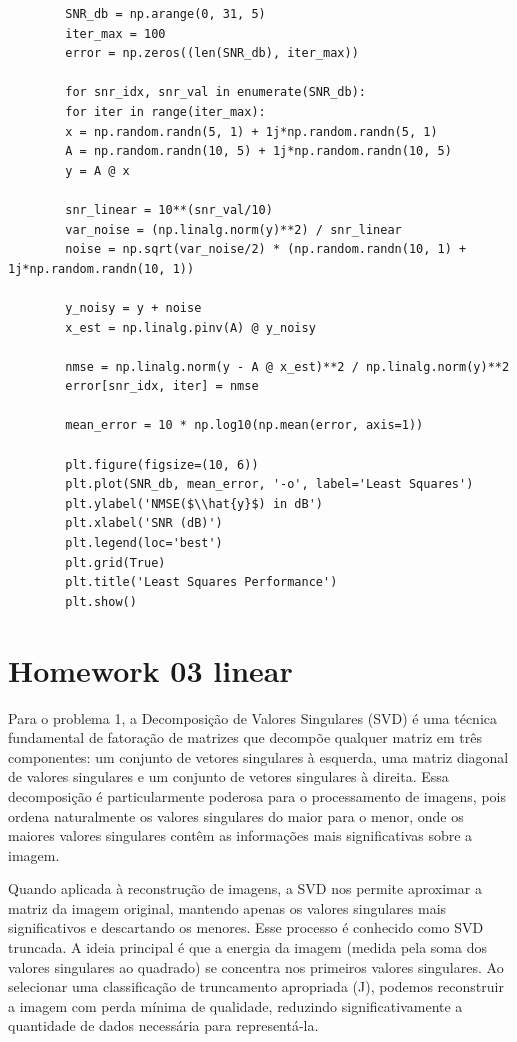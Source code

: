 	\begin{lstlisting}
		SNR_db = np.arange(0, 31, 5)
		iter_max = 100
		error = np.zeros((len(SNR_db), iter_max))
		
		for snr_idx, snr_val in enumerate(SNR_db):
		for iter in range(iter_max):
		x = np.random.randn(5, 1) + 1j*np.random.randn(5, 1)
		A = np.random.randn(10, 5) + 1j*np.random.randn(10, 5)
		y = A @ x
		
		snr_linear = 10**(snr_val/10)
		var_noise = (np.linalg.norm(y)**2) / snr_linear
		noise = np.sqrt(var_noise/2) * (np.random.randn(10, 1) + 1j*np.random.randn(10, 1))
		
		y_noisy = y + noise
		x_est = np.linalg.pinv(A) @ y_noisy
		
		nmse = np.linalg.norm(y - A @ x_est)**2 / np.linalg.norm(y)**2
		error[snr_idx, iter] = nmse
		
		mean_error = 10 * np.log10(np.mean(error, axis=1))
		
		plt.figure(figsize=(10, 6))
		plt.plot(SNR_db, mean_error, '-o', label='Least Squares')
		plt.ylabel('NMSE($\\hat{y}$) in dB')
		plt.xlabel('SNR (dB)')
		plt.legend(loc='best')
		plt.grid(True)
		plt.title('Least Squares Performance')
		plt.show()
	\end{lstlisting}
	
	\section{Homework 03 linear}
	
	Para o problema 1, a Decomposição de Valores Singulares (SVD) é uma técnica fundamental de fatoração de matrizes que decompõe qualquer matriz em três componentes: um conjunto de vetores singulares à esquerda, uma matriz diagonal de valores singulares e um conjunto de vetores singulares à direita. Essa decomposição é particularmente poderosa para o processamento de imagens, pois ordena naturalmente os valores singulares do maior para o menor, onde os maiores valores singulares contêm as informações mais significativas sobre a imagem.
	
	Quando aplicada à reconstrução de imagens, a SVD nos permite aproximar a matriz da imagem original, mantendo apenas os valores singulares mais significativos e descartando os menores. Esse processo é conhecido como SVD truncada. A ideia principal é que a energia da imagem (medida pela soma dos valores singulares ao quadrado) se concentra nos primeiros valores singulares. Ao selecionar uma classificação de truncamento apropriada (J), podemos reconstruir a imagem com perda mínima de qualidade, reduzindo significativamente a quantidade de dados necessária para representá-la.
	
